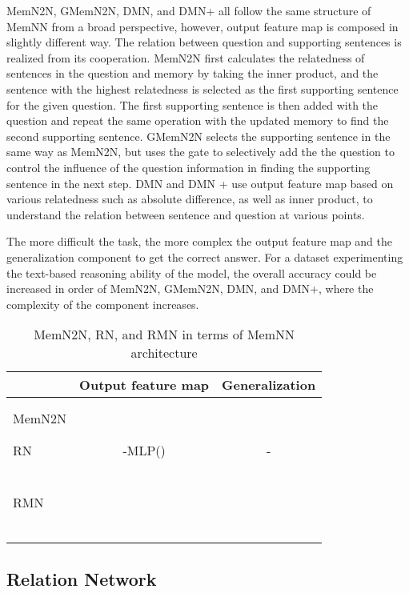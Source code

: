 \documentclass{article} \usepackage{iclr2018_conference,times}
\begin{document}
MemN2N, GMemN2N, DMN, and DMN+ all follow the same structure of MemNN from a broad perspective, however, output feature map is composed in slightly different way.
The relation between question and supporting sentences is realized from its cooperation.
MemN2N first calculates the relatedness of sentences in the question and memory by taking the inner product, and the sentence with the highest relatedness is selected as the first supporting sentence for the given question.
The first supporting sentence is then added with the question and repeat the same operation with the updated memory to find the second supporting sentence.
GMemN2N selects the supporting sentence in the same way as MemN2N, but uses the gate to selectively add the the question to control the influence of the question information in finding the supporting sentence in the next step.
DMN and DMN + use output feature map based on various relatedness such as absolute difference, as well as inner product, to understand the relation between sentence and question at various points.

The more difficult the task, the more complex the output feature map and the generalization component to get the correct answer.
For a dataset experimenting the text-based reasoning ability of the model, the overall accuracy could be increased in order of MemN2N, GMemN2N, DMN, and DMN+, where the complexity of the component increases.


\begin{table}[t]
\centering
	\caption{MemN2N, RN, and RMN in terms of MemNN architecture}
	\label{table:comparisons}
\begin{tabular}{l|c|c}
\hline
        & Output feature map & Generalization \\ \hline
MemN2N  &   \makecell{\rule{0in}{2.7ex} \\  \\ }    &                   \\ [3.3ex] \hline
RN    &         \makecell{\rule{0in}{2.5ex}-MLP() \\ }           &          -         \\  [2ex] \hline
RMN      &         \makecell{\rule{0in}{2.5ex} \\\rule{0in}{2.1ex}  \\  }          &               \\ [3.5ex] \hline
\end{tabular}
\end{table}


\subsection{Relation Network}
\end{document}
